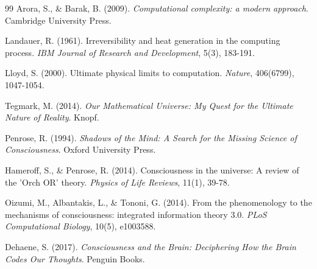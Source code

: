 \documentclass[12pt,a4paper]{article}
\begin{document}
\begin{thebibliography}{99}
Arora, S., \& Barak, B. (2009). \textit{Computational complexity: a modern approach}. Cambridge University Press.

Landauer, R. (1961). Irreversibility and heat generation in the computing process. \textit{IBM Journal of Research and Development}, 5(3), 183-191.

Lloyd, S. (2000). Ultimate physical limits to computation. \textit{Nature}, 406(6799), 1047-1054.

Tegmark, M. (2014). \textit{Our Mathematical Universe: My Quest for the Ultimate Nature of Reality}. Knopf.

Penrose, R. (1994). \textit{Shadows of the Mind: A Search for the Missing Science of Consciousness}. Oxford University Press.

Hameroff, S., \& Penrose, R. (2014). Consciousness in the universe: A review of the 'Orch OR' theory. \textit{Physics of Life Reviews}, 11(1), 39-78.

Oizumi, M., Albantakis, L., \& Tononi, G. (2014). From the phenomenology to the mechanisms of consciousness: integrated information theory 3.0. \textit{PLoS Computational Biology}, 10(5), e1003588.

Dehaene, S. (2017). \textit{Consciousness and the Brain: Deciphering How the Brain Codes Our Thoughts}. Penguin Books.

\end{thebibliography}
\end{document}
